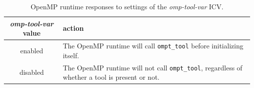 \documentclass{article}
\begin{document}
 \begin{table}
\begin{center}
\begin{tabular}{|c|p{4.5in}|}
\hline
 {\em omp-tool-var} value & action \\\hline
enabled & The OpenMP runtime will call  \verb|ompt_tool| before initializing itself.   \\\hline
disabled & The OpenMP runtime will not call  \verb|ompt_tool|, regardless of whether a tool is present or not.  \\\hline

\end{tabular}
\end{center}
\caption{OpenMP runtime responses to settings of the {\em omp-tool-var} ICV.}
\label{table:env-var}
\end{table}

\end{document}
